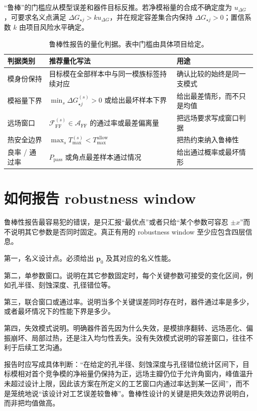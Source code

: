 “鲁棒”的门槛应从模型误差和器件目标反推。若净模裕量的合成不确定度为 $u_{\Delta G}$，可要求名义点满足 $\Delta G_{\star j}>k u_{\Delta G}$，并在规定容差集合内保持 $\Delta G_{\star j}>0$；置信系数 $k$ 由项目风险水平确定。

\begin{table}[htbp]
  \centering
  \footnotesize
  \caption{鲁棒性报告的量化判据。表中门槛由具体项目给定。}
  \label{tab:robustness_quantitative}
  \begin{tabularx}{\textwidth}{@{}p{2.8cm}p{3.1cm}Y@{}}
    \toprule
    判据类别 & 推荐量化写法 & 用途 \\ \midrule
    模身份保持 & 目标模在全部样本中与同一模族标签持续对应 & 确认比较的始终是同一支模式 \\
    模裕量下界 & $\min_s \Delta G_{\star j}^{(s)} > 0$ 或给出最坏样本下界 & 给出最差情形，而不只是均值 \\
    远场窗口 & $\mathcal{F}_{\mathrm{FF}}^{(s)} \in \mathcal{A}_{\mathrm{FF}}$ 的通过率或最差偏离量 & 把远场要求写成窗口判据 \\
    热安全边界 & $\max_s T_{\max}^{(s)} < T_{\max}^{\mathrm{allow}}$ & 把热约束纳入鲁棒性 \\
    良率 / 通过率 & $P_{\mathrm{pass}}$ 或角点最差样本通过情况 & 给出通过概率或最坏情形 \\
    \bottomrule
  \end{tabularx}
\end{table}

\section{如何报告 robustness window}
鲁棒性报告最容易犯的错误，是只汇报“最优点”或者只给“某个参数可容忍 $\pm x$”而不说明其它参数是否同时固定。真正有用的 robustness window 至少应包含四层信息。

第一，名义设计点。必须给出 $\bm{p}_0$ 及其对应的名义性能。

第二，单参数窗口。说明在其它参数固定时，每个关键参数可接受的变化区间，例如孔半径、刻蚀深度、孔径错位等。

第三，联合窗口或通过率。说明当多个关键误差同时存在时，器件通过率是多少，或者最坏情况下的性能下界是多少。

第四，失效模式说明。明确器件首先因为什么失效，是模排序翻转、远场恶化、偏振崩坏、局部过热，还是注入均匀性丢失。没有失效模式说明的容差窗口，往往不利于后续工艺沟通。

报告时应写成具体判断：“在给定的孔半径、刻蚀深度与孔径错位统计区间下，目标模相对首个竞争模的净裕量仍保持为正，远场主瓣仍位于允许角窗内，峰值温升未超过设计上限，因此该方案在所定义的工艺窗口内通过率达到某一区间”，而不是笼统地说“该设计对工艺误差较鲁棒”。鲁棒性设计的关键是把失效边界说明白，而非把均值做高。

